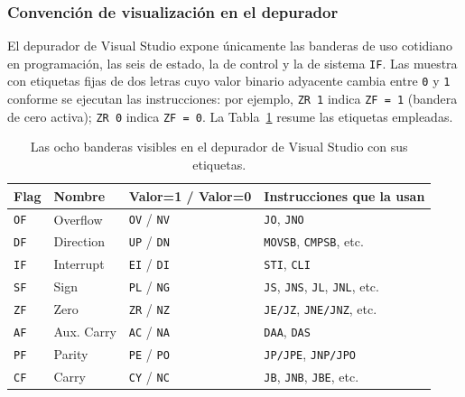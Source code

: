 \documentclass[a4paper,12pt]{article}
\begin{document}
\subsubsection*{Convención de visualización en el depurador}

El depurador de Visual Studio expone únicamente las banderas de uso cotidiano en programación, las seis de estado, la de control y la de sistema \texttt{IF}. Las muestra con etiquetas fijas de dos letras cuyo valor binario adyacente cambia entre \texttt{0} y \texttt{1} conforme se ejecutan las instrucciones: por ejemplo, \texttt{ZR~1} indica \texttt{ZF = 1} (bandera de cero activa); \texttt{ZR~0} indica \texttt{ZF = 0}. La Tabla~\ref{tab:banderas_vs} resume las etiquetas empleadas.

\begin{table}[H]
\centering
\caption{Las ocho banderas visibles en el depurador de Visual Studio con sus etiquetas.}
\label{tab:banderas_vs}
\renewcommand{\arraystretch}{1.3}
\setlength{\tabcolsep}{5pt}
\begin{tabular}{
    >{\centering\arraybackslash}m{1.1cm}
    >{\centering\arraybackslash}m{2.5cm}
    >{\centering\arraybackslash}m{2.2cm}
    >{\raggedright\arraybackslash}m{5.0cm}
}
\toprule
\rowcolor{VerdeUABC}
\color{white}\textbf{Flag} &
\color{white}\textbf{Nombre} &
\color{white}\textbf{Valor=1 / Valor=0} &
\color{white}\textbf{Instrucciones que la usan} \\
\midrule

\rowcolor{rowLight}
\texttt{OF} & Overflow    & \texttt{OV} / \texttt{NV} & \texttt{JO}, \texttt{JNO} \\
\texttt{DF} & Direction   & \texttt{UP} / \texttt{DN} & \texttt{MOVSB}, \texttt{CMPSB}, etc. \\
\rowcolor{rowLight}
\texttt{IF} & Interrupt   & \texttt{EI} / \texttt{DI} & \texttt{STI}, \texttt{CLI} \\
\texttt{SF} & Sign        & \texttt{PL} / \texttt{NG} & \texttt{JS}, \texttt{JNS}, \texttt{JL}, \texttt{JNL}, etc. \\
\rowcolor{rowLight}
\texttt{ZF} & Zero        & \texttt{ZR} / \texttt{NZ} & \texttt{JE/JZ}, \texttt{JNE/JNZ}, etc. \\
\texttt{AF} & Aux. Carry  & \texttt{AC} / \texttt{NA} & \texttt{DAA}, \texttt{DAS} \\
\rowcolor{rowLight}
\texttt{PF} & Parity      & \texttt{PE} / \texttt{PO} & \texttt{JP/JPE}, \texttt{JNP/JPO} \\
\texttt{CF} & Carry       & \texttt{CY} / \texttt{NC} & \texttt{JB}, \texttt{JNB}, \texttt{JBE}, etc. \\

\bottomrule
\end{tabular}
\end{table}
\end{document}

